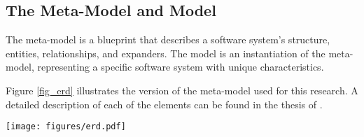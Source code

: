 \subsection{The Meta-Model and Model} \label{sec_artifact_meta_model}

The meta-model is a blueprint that describes a software system's structure, entities,
relationships, and expanders. The model is an instantiation of the meta-model,
representing a specific software system with unique characteristics. 

Figure \ref{fig_erd} illustrates the version of the meta-model used for this research. A
detailed description of each of the elements can be found in the thesis of
\citeauthor{koks_convergence_2023} \cite[73]{koks_convergence_2023}.

\begin{figure*}[ht!]
    \centering
    \centerline{\texttt{[image: figures/erd.pdf]}}
    \caption[The meta-model is represented as an Entity Relationship Diagram]{The meta-model represented as an Entity Relationship Diagram}
    \label{fig_erd}
\end{figure*}